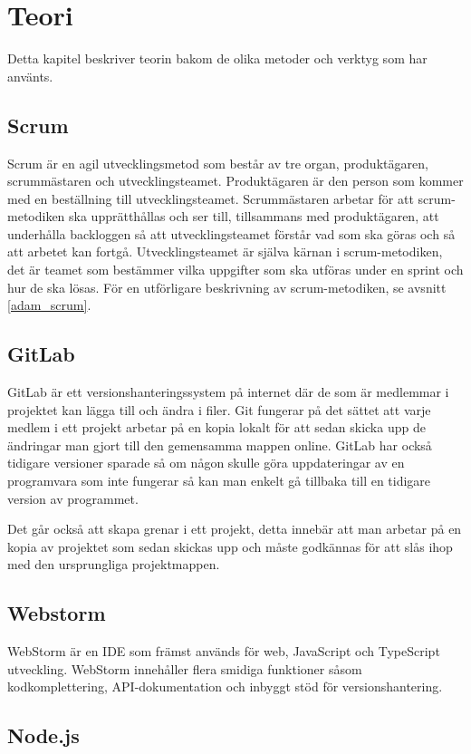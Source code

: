 \chapter{Teori}
Detta kapitel beskriver teorin bakom de olika metoder och verktyg som har använts.

\section{Scrum} \label{scrum}
Scrum är en agil utvecklingsmetod som består av tre organ, produktägaren, scrummästaren och utvecklingsteamet. Produktägaren är den person som kommer med en beställning till utvecklingsteamet. Scrummästaren arbetar för att scrum-metodiken ska upprätthållas och ser till, tillsammans med produktägaren, att underhålla backloggen så att utvecklingsteamet förstår vad som ska göras och så att arbetet kan fortgå. Utvecklingsteamet är själva kärnan i scrum-metodiken, det är teamet som bestämmer vilka uppgifter som ska utföras under en sprint och hur de ska lösas. För en utförligare beskrivning av scrum-metodiken, se avsnitt \ref{adam_scrum}.

\section{GitLab}
GitLab är ett versionshanteringssystem på internet där de som är medlemmar i projektet kan lägga till och ändra i filer. Git fungerar på det sättet att varje medlem i ett projekt arbetar på en kopia lokalt för att sedan skicka upp de ändringar man gjort till den gemensamma mappen online. GitLab har också tidigare versioner sparade så om någon skulle göra uppdateringar av en programvara som inte fungerar så kan man enkelt gå tillbaka till en tidigare version av programmet.

Det går också att skapa grenar i ett projekt, detta innebär att man arbetar på en kopia av projektet som sedan skickas upp och måste godkännas för att slås ihop med den ursprungliga projektmappen. \cite{gitlab}

\section{Webstorm}
WebStorm är en IDE som främst används för web, JavaScript och TypeScript utveckling. WebStorm innehåller flera smidiga funktioner såsom kodkomplettering, API-dokumentation och inbyggt stöd för versionshantering. \cite{webstorm}

\section{Node.js}

